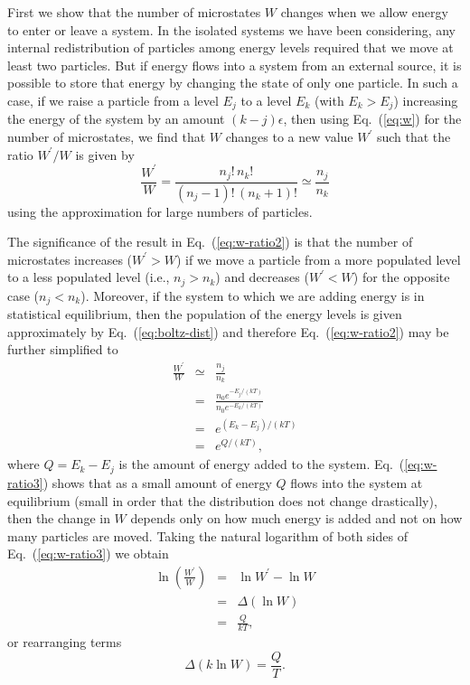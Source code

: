 First we show that the number of microstates $W$ changes when we allow
energy to enter or leave a system.  In the isolated systems we have
been considering, any internal redistribution of particles among
energy levels required that we move at least two particles.  But if
energy flows into a system from an external source, it is possible to
store that energy by changing the state of only one particle.  In such
a case, if we raise a particle from a level $E_j$ to a level $E_k$
(with $E_k> E_j$) increasing the energy of the system by an amount
$(k-j)\epsilon$, then using Eq.~(\ref{eq:w}) for the number of microstates,
we find that $W$ changes to a new value $W^\prime$ such that the ratio
$W^\prime/W$ is given by
\begin{equation}
\frac{W^\prime}{W} = \frac{n_j!\,n_k!}{(n_j-1)!\, (n_k+1)!} \simeq
 \frac{n_j}{n_k}
\label{eq:w-ratio2}
\end{equation}
using the approximation for large numbers of particles.
     
The significance of the result in Eq.~(\ref{eq:w-ratio2}) is that the number
of microstates increases ($W^\prime>W$) if we move a particle from a
more populated level to a less populated level (i.e., $n_j > n_k$) and
decreases ($W^\prime<W$) for the opposite case ($n_j < n_k$).
Moreover, if the system to which we are adding energy is in
statistical equilibrium, then the population of the energy levels is
given approximately by Eq.~(\ref{eq:boltz-dist}) and therefore
Eq.~(\ref{eq:w-ratio2}) may be further simplified to
\begin{eqnarray}
\frac{W^\prime}{W} &\simeq& \frac{n_j}{n_k} \nonumber \\
                   &=& \frac{n_0 e^{-E_j/(kT)}}{n_0 e^{-E_k/(kT)}} 
                                                  \nonumber \\
                   &=& e^{(E_k-E_j)/(kT)} \nonumber \\
                   &=& e^{Q/(kT)},
\label{eq:w-ratio3}
\end{eqnarray} 
where $Q = E_k - E_j$ is the amount of energy added to the system.
Eq.~(\ref{eq:w-ratio3}) shows that as a small amount of energy $Q$
flows into the system at equilibrium (small in order that the
distribution does not change drastically), then the change in $W$
depends only on how much energy is added and not on how many particles
are moved.  Taking the natural logarithm of both sides of
Eq.~(\ref{eq:w-ratio3}) we obtain
\begin{eqnarray}
\ln\left(\frac{W^\prime}{W}\right) &=& \ln W^\prime - \ln W \nonumber \\
                                   &=& \Delta(\ln W) \nonumber \\
                                   &=& \frac{Q}{kT},
\end{eqnarray}     
or rearranging terms
\begin{equation}
\Delta(k\ln W) = \frac{Q}{T}.
\label{eq:pre-entropy}
\end{equation}
     
